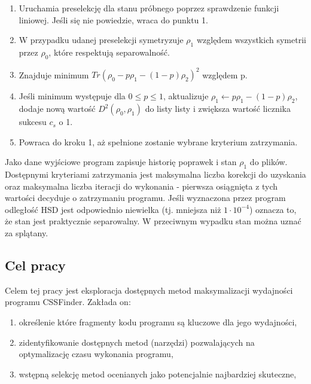 \documentclass[11pt, a4paper]{article}
\begin{document}
\begin{sloppypar}
\begin{enumerate}
      \item Uruchamia preselekcję dla stanu próbnego poprzez sprawdzenie funkcji liniowej.
        Jeśli się nie powiedzie, wraca do punktu 1.

      \item W przypadku udanej preselekcji symetryzuje $\rho_{1}$ względem wszystkich symetrii
        przez $\rho_{0}$, które respektują separowalność.

      \item Znajduje minimum $Tr(\rho_{0}- p\rho_{1}- (1 - p)\rho_{2})^{2}$ względem p.

      \item Jeśli minimum występuje dla $0 \le p \le 1$, aktualizuje
        $\rho_{1}\leftarrow p\rho_{1}- (1 - p)\rho_{2}$, dodaje nową wartość $D^{2}(\rho_{0}
        , \rho_{1})$ do listy listy i zwiększa wartość licznika sukcesu $c_{s}$ o 1.

      \item Powraca do kroku 1, aż spełnione zostanie wybrane kryterium zatrzymania.
    \end{enumerate}

    Jako dane wyjściowe program zapisuje historię poprawek i stan $\rho_{1}$ do plików. Dostępnymi
    kryteriami zatrzymania jest maksymalna liczba korekcji do uzyskania oraz maksymalna liczba
    iteracji do wykonania - pierwsza osiągnięta z tych wartości decyduje o zatrzymaniu programu.
    Jeśli wyznaczona przez program odległość HSD jest odpowiednio niewielka (tj.
    mniejsza niż $1 \cdot 10^{-4}$) oznacza to, że stan jest praktycznie separowalny. W przeciwnym
    wypadku stan można uznać za splątany.

    \subsection{Cel pracy}
    Celem tej pracy jest eksploracja dostępnych metod maksymalizacji wydajności programu
    CSSFinder. Zakłada on:
    \begin{enumerate}
      \item określenie które fragmenty kodu programu są kluczowe dla jego wydajności,

      \item zidentyfikowanie dostępnych metod (narzędzi) pozwalających na optymalizację czasu
        wykonania programu,

      \item wstępną selekcję metod ocenianych jako potencjalnie najbardziej skuteczne,


\end{enumerate}
\end{sloppypar}
\end{document}
